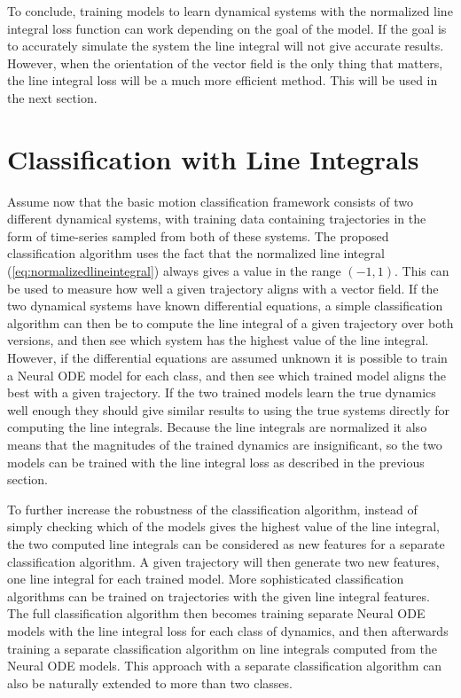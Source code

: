 \documentclass[12pt,a4paper]{book}
\begin{document}
To conclude, training models to learn dynamical systems with the normalized line integral loss function can work depending on the goal of the model. If the goal is to accurately simulate the system the line integral will not give accurate results. However, when the orientation of the vector field is the only thing that matters, the line integral loss will be a much more efficient method. This will be used in the next section.

\section{Classification with Line Integrals}

Assume now that the basic motion classification framework consists of two different dynamical systems, with training data containing trajectories in the form of time-series sampled from both of these systems. The proposed classification algorithm uses the fact that the normalized line integral (\ref{eq:normalizedlineintegral}) always gives a value in the range $(-1, 1)$. This can be used to measure how well a given trajectory aligns with a vector field. If the two dynamical systems have known differential equations, a simple classification algorithm can then be to compute the line integral of a given trajectory over both versions, and then see which system has the highest value of the line integral. However, if the differential equations are assumed unknown it is possible to train a Neural ODE model for each class, and then see which trained model aligns the best with a given trajectory. If the two trained models learn the true dynamics well enough they should give similar results to using the true systems directly for computing the line integrals. Because the line integrals are normalized it also means that the magnitudes of the trained dynamics are insignificant, so the two models can be trained with the line integral loss as described in the previous section.

To further increase the robustness of the classification algorithm, instead of simply checking which of the models gives the highest value of the line integral, the two computed line integrals can be considered as new features for a separate classification algorithm. A given trajectory will then generate two new features, one line integral for each trained model. More sophisticated classification algorithms can be trained on trajectories with the given line integral features. The full classification algorithm then becomes training separate Neural ODE models with the line integral loss for each class of dynamics, and then afterwards training a separate classification algorithm on line integrals computed from the Neural ODE models. This approach with a separate classification algorithm can also be naturally extended to more than two classes.
\end{document}
